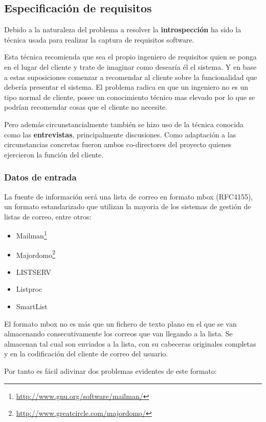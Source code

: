
\subsection{Especificación de requisitos}

Debido a la naturaleza del problema a resolver la \textbf{introspección}
ha sido la técnica usada para realizar la captura de requisitos software.

Esta técnica recomienda que sea el propio ingeniero de requisitos quien 
se ponga en el lugar del cliente y trate de imaginar como desearía él el 
sistema. Y en base a estas suposiciones comenzar a recomendar al cliente 
sobre la funcionalidad que debería presentar el sistema. El problema radica 
en  que un ingeniero no es un tipo normal de cliente, posee un conocimiento 
técnico mas elevado por lo que se podrían recomendar cosas que el cliente 
no necesite.

Pero además circunstancialmente también se hizo uso de la técnica conocida
como las \textbf{entrevistas}, principalmente discusiones. Como adaptación
a las circunstancias concretas fueron ambos co-directores del proyecto 
quienes ejercieron la función del cliente.

\subsubsection{Datos de entrada}

La fuente de información será una lista de correo en formato mbox 
(RFC4155\cite{Hall2005}), un formato estandarizado que utilizan la 
mayoria de los sistemas de gestión de listas de correo, entre otros:

\begin{itemize}
 \item Mailman\footnote{\url{http://www.gnu.org/software/mailman/}}
 \item Majordomo\footnote{\url{http://www.greatcircle.com/majordomo/}}
 \item LISTSERV
 \item Listproc
 \item SmartList
\end{itemize}

El formato mbox no es más que un fichero de texto plano en el que se van
almacenando consecutivamente los correos que van llegando a la lista. Se 
almacenan tal cual son enviados a la lista, con su cabeceras originales 
completas y en la codificación del cliente de correo del usuario.

Por tanto es fácil adivinar dos problemas evidentes de este formato:

